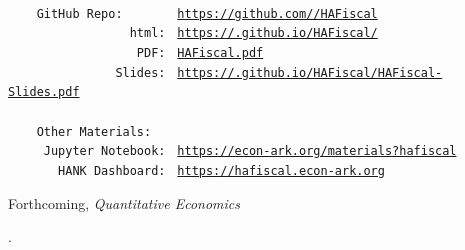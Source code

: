 \documentclass[\latexroot/\projectname]{subfiles}
\begin{document}
\providecommand{\REMARK}{\href{https://github.com/econ-ark/REMARK}{REMARK}}
\begin{footnotesize}
  \setlength{\parskip}{0pt}
  \parbox{0.9\textwidth}{
    \begin{tabbing}
      \texttt{~~~~~~~~~~~~~~~~~~~~~~~} \= \=  \\
      \texttt{~~~~GitHub~Repo:~~~~~~~} \> \> \texttt{\href{https://github.com/\owner/HAFiscal}{https://github.com/\owner/HAFiscal}} \\
      \texttt{~~~~~~~~~~~~~~~~~html:~} \> \> \texttt{\href{https://\owner.github.io/HAFiscal/}{https://\owner.github.io/HAFiscal/}} \\
      \texttt{~~~~~~~~~~~~~~~~~~PDF:~} \> \> \texttt{\href{https://github.com/\owner/HAFiscal/blob/master/HAFiscal.pdf}{HAFiscal.pdf}} \\
      \texttt{~~~~~~~~~~~~~~~Slides:~} \> \> \texttt{\href{https://\owner.github.io/HAFiscal/HAFiscal-Slides.pdf}{https://\owner.github.io/HAFiscal/HAFiscal-Slides.pdf}} \\
      \texttt{~~~~~~~~~~~~~~~~~~~~~~~} \> \>  \\
      \texttt{~~~~Other~Materials:~~~} \> \> \\
      \texttt{~~~~~Jupyter~Notebook:~} \> \> \texttt{\href{https://econ-ark.org/materials?hafiscal}{https://econ-ark.org/materials?hafiscal}} \\
      \texttt{~~~~~~~HANK~Dashboard:~} \> \> \texttt{\href{https://hafiscal.econ-ark.org}{https://hafiscal.econ-ark.org}} \\
    \end{tabbing}
  } %
\end{footnotesize}
\vspace{-0.3\baselineskip}



\centerline{Forthcoming, \textit{Quantitative Economics}}
\vspace{-0.3\baselineskip}

\begin{authorsinfo}
  \noindent {}. \newline
   \newline
   \newline
   \newline
\end{authorsinfo}
\end{document}
